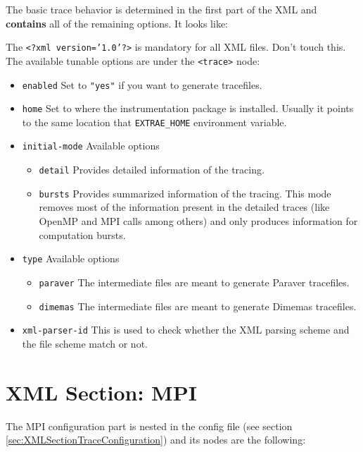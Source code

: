 The basic trace behavior is determined in the first part of the XML and {\bf contains} all of the remaining options. It looks like:



The {\tt <?xml version='1.0'?>} is mandatory for all XML files. Don't touch this. The available tunable options are under the {\tt <trace>} node:
\begin{itemize}
 \item {\tt enabled} Set to {\tt "yes"} if you want to generate tracefiles.
 \item {\tt home} Set to where the instrumentation package is installed. Usually it points to the same location that {\tt EXTRAE\_HOME} environment variable.
 \item {\tt initial-mode} Available options
  \begin{itemize}
   \item {\tt detail} Provides detailed information of the tracing.
   \item {\tt bursts} Provides summarized information of the tracing. This mode removes most of the information present in the detailed traces (like OpenMP and MPI calls among others) and only produces information for computation bursts.
  \end{itemize} 
 \item {\tt type} Available options
  \begin{itemize}
   \item {\tt paraver} The intermediate files are meant to generate Paraver tracefiles.
   \item {\tt dimemas} The intermediate files are meant to generate Dimemas tracefiles.
  \end{itemize}
 \item {\tt xml-parser-id} This is used to check whether the XML parsing scheme and the file scheme match or not.
\end{itemize}


\section{XML Section: MPI}\label{sec:XMLSectionMPI}

The MPI configuration part is nested in the config file (see section \ref{sec:XMLSectionTraceConfiguration}) and its nodes are the following:

